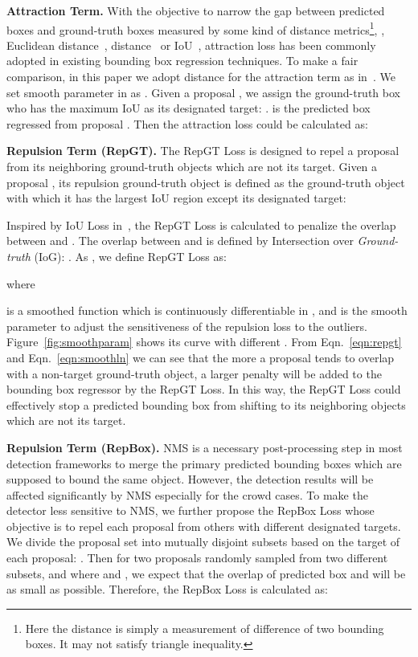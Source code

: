 \documentclass[10pt,twocolumn,letterpaper]{article}
\newcommand{\myparagraph}[1]{{\vspace{0.5em} \noindent \bf #1}}
\begin{document}
\myparagraph{Attraction Term.} With the objective to narrow the gap between predicted boxes and ground-truth boxes measured by some kind of distance metrics\footnote{Here the distance is simply a measurement of difference of two bounding boxes. It may not satisfy triangle inequality.}, \eg, Euclidean distance~\cite{Girshick_2014_CVPR},  distance~\cite{Girshick_2015_ICCV} or IoU~\cite{yu2016unitbox}, attraction loss has been commonly adopted in existing bounding box regression techniques. To make a fair comparison, in this paper we adopt  distance for the attraction term as in~\cite{mao2017can,zhang2017citypersons}. We set smooth parameter in  as . Given a proposal , we assign the ground-truth box who has the maximum IoU as its designated target: .  is the predicted box regressed from proposal . Then the attraction loss could be calculated as:



\myparagraph{Repulsion Term (RepGT).} The RepGT Loss is designed to repel a proposal from its neighboring ground-truth objects which are not its target. Given a proposal , its repulsion ground-truth object is defined as the ground-truth object with which it has the largest IoU region except its designated target:

Inspired by IoU Loss in~\cite{yu2016unitbox}, the RepGT Loss is calculated to penalize the overlap between  and .  The overlap between  and  is defined by Intersection over {\it Ground-truth} (IoG): . As , we define RepGT Loss as:

where

is a smoothed  function which is continuously differentiable in , and  is the smooth parameter to adjust the sensitiveness of the repulsion loss to the outliers. Figure~\ref{fig:smoothparam} shows its curve with different . From Eqn.~\ref{eqn:repgt} and Eqn.~\ref{eqn:smoothln} we can see that the more a proposal tends to overlap with a non-target ground-truth object, a larger penalty will be added to the bounding box regressor by the RepGT Loss. In this way, the RepGT Loss could effectively stop a predicted bounding box from shifting to its neighboring objects which are not its target.

\myparagraph{Repulsion Term (RepBox).} NMS is a necessary post-processing step in most detection frameworks to merge the primary predicted bounding boxes which are supposed to bound the same object. However, the detection results will be affected significantly by NMS especially for the crowd cases. To make the detector less sensitive to NMS, we further propose the RepBox Loss whose objective is to repel each proposal from others with different designated targets. We divide the proposal set  into  mutually disjoint subsets based on the target of each proposal: . Then for two proposals randomly sampled from two different subsets,  and  where  and , we expect that the overlap of predicted box  and  will be as small as possible. Therefore, the RepBox Loss is calculated as:
\end{document}
